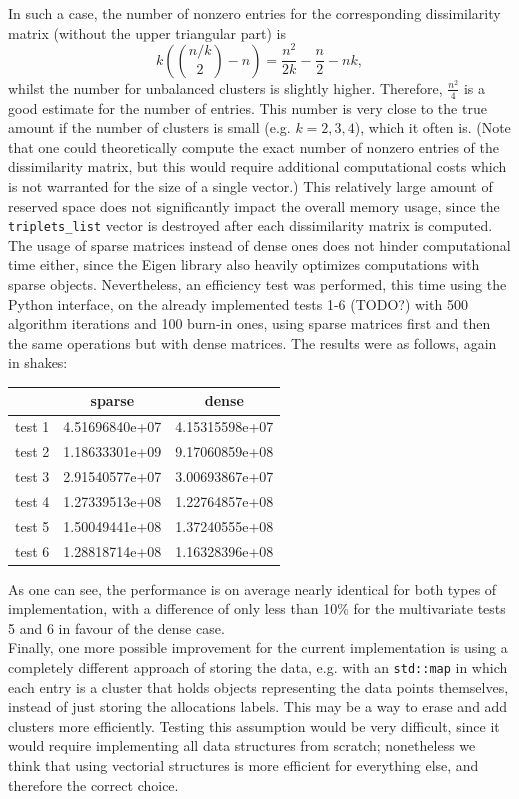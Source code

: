 In such a case, the number of nonzero entries for the corresponding dissimilarity matrix (without the upper triangular part) is
$$ k \left(\binom{n/k}{2} - n\right) = \frac{n^2}{2k} -\frac{n}{2} - nk,$$
whilst the number for unbalanced clusters is slightly higher.
Therefore, $\frac{n^2}{4}$ is a good estimate for the number of entries.
This number is very close to the true amount if the number of clusters is small (e.g. $k=2,3,4$), which it often is. (Note that one could theoretically compute the exact number of nonzero entries of the dissimilarity matrix, but this would require additional computational costs which is not warranted for the size of a single vector.)
This relatively large amount of reserved space does not significantly impact the overall memory usage, since the \verb|triplets_list| vector is destroyed after each dissimilarity matrix is computed. \\
The usage of sparse matrices instead of dense ones does not hinder computational time either, since the Eigen library also heavily optimizes computations with sparse objects.
Nevertheless, an efficiency test was performed, this time using the Python interface, on the already implemented tests 1-6 (TODO?) with 500 algorithm iterations and 100 burn-in ones, using sparse matrices first and then the same operations but with dense matrices.
The results were as follows, again in shakes:
\begin{center}
	\begin{tabular}{c|c|c}
       &      sparse    &      dense     \\ \hline
test 1 & 4.51696840e+07 & 4.15315598e+07 \\
test 2 & 1.18633301e+09 & 9.17060859e+08 \\
test 3 & 2.91540577e+07 & 3.00693867e+07 \\
test 4 & 1.27339513e+08 & 1.22764857e+08 \\
test 5 & 1.50049441e+08 & 1.37240555e+08 \\
test 6 & 1.28818714e+08 & 1.16328396e+08
	\end{tabular}
\end{center}
As one can see, the performance is on average nearly identical for both types of implementation, with a difference of only less than 10\% for the multivariate tests 5 and 6 in favour of the dense case. \\[8pt]
Finally, one more possible improvement for the current implementation is using a completely different approach of storing the data, e.g. with an \verb|std::map| in which each entry is a cluster that holds objects representing the data points themselves, instead of just storing the allocations labels.
This may be a way to erase and add clusters more efficiently.
Testing this assumption would be very difficult, since it would require implementing all data structures from scratch; nonetheless we think that using vectorial structures is more efficient for everything else, and therefore the correct choice.


